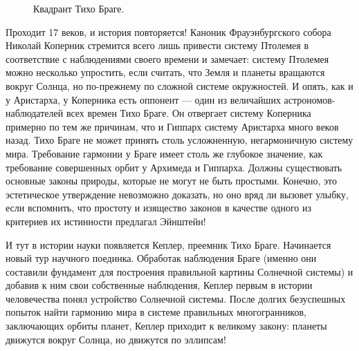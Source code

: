 \documentclass[twocolumn,10pt]{article}
\begin{document}
\begin{figure}[ht]
\begin{center}
\end{center}
\caption{Квадрант Тихо Браге.}
\end{figure}

Проходит 17 веков, и история повторяется! Каноник Фрауэнбургского собора Николай Коперник стремится всего лишь привести систему Птолемея в соответствие с наблюдениями своего времени и замечает: систему Птолемея можно несколько упростить, если считать, что Земля и планеты вращаются вокруг Солнца, но по-прежнему по сложной системе окружностей. И опять, как и у Аристарха, у Коперника есть оппонент --- один из величайших астрономов-наблюдателей всех времен Тихо Браге. Он отвергает систему Коперника примерно по тем же причинам, что и Гиппарх систему Аристарха много веков назад. Тихо Браге не может принять столь усложненную, негармоничную систему мира. Требование гармонии у Браге имеет столь же глубокое значение, как требование совершенных орбит у Архимеда и Гиппарха. Должны существовать основные законы природы, которые не могут не быть простыми. Конечно, это эстетическое утверждение невозможно доказать, но оно вряд ли вызовет улыбку, если вспомнить, что простоту и изящество законов в качестве одного из критериев их истинности предлагал Эйнштейн!

И тут в истории науки появляется Кеплер, преемник Тихо Браге. Начинается новый тур научного поединка. Обработак наблюдения Браге (именно они составили фундамент для построения правильной картины Солнечной системы) и добавив к ним свои собственные наблюдения, Кеплер первым в истории человечества понял устройство Солнечной системы. После долгих безуспешных попыток найти гармонию мира в системе правильных многогранников, заключающих орбиты планет, Кеплер приходит к великому закону: планеты движутся вокруг Солнца, но движутся по эллипсам!
\end{document}
